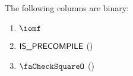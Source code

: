 The following columns are binary:
\begin{multicols}{2}
\begin{enumerate}
	\item $\iomf$
	\item $\textsf{IS\_PRECOMPILE}$ \quad (\trash)
	\item $\done$ \quad (\trash)
\end{enumerate}
\end{multicols}
